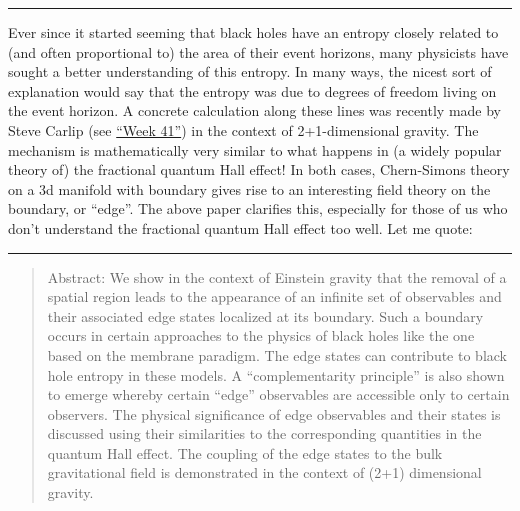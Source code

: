 \documentclass{article}
\def\tightlist{}
\renewcommand{\texttt}[1]{%
  \begingroup
  \ttfamily
  \begingroup\lccode`~=`/\lowercase{\endgroup\def~}{/\discretionary{}{}{}}%
  \begingroup\lccode`~=`[\lowercase{\endgroup\def~}{[\discretionary{}{}{}}%
  \begingroup\lccode`~=`.\lowercase{\endgroup\def~}{.\discretionary{}{}{}}%
  \catcode`/=\active\catcode`[=\active\catcode`.=\active
  \scantokens{#1\noexpand}%
  \endgroup
}
\begin{document}
\begin{center}\rule{0.5\linewidth}{0.5pt}\end{center}


Ever since it started seeming that black holes have an entropy closely
related to (and often proportional to) the area of their event horizons,
many physicists have sought a better understanding of this entropy. In
many ways, the nicest sort of explanation would say that the entropy was
due to degrees of freedom living on the event horizon. A concrete
calculation along these lines was recently made by Steve Carlip (see
\protect\hyperlink{week41}{``Week 41''}) in the context of
2+1-dimensional gravity. The mechanism is mathematically very similar to
what happens in (a widely popular theory of) the fractional quantum Hall
effect! In both cases, Chern-Simons theory on a 3d manifold with
boundary gives rise to an interesting field theory on the boundary, or
``edge''. The above paper clarifies this, especially for those of us who
don't understand the fractional quantum Hall effect too well. Let me
quote:

\begin{center}\rule{0.5\linewidth}{0.5pt}\end{center}

\begin{quote}
Abstract: We show in the context of Einstein gravity that the removal of
a spatial region leads to the appearance of an infinite set of
observables and their associated edge states localized at its boundary.
Such a boundary occurs in certain approaches to the physics of black
holes like the one based on the membrane paradigm. The edge states can
contribute to black hole entropy in these models. A ``complementarity
principle'' is also shown to emerge whereby certain ``edge'' observables
are accessible only to certain observers. The physical significance of
edge observables and their states is discussed using their similarities
to the corresponding quantities in the quantum Hall effect. The coupling
of the edge states to the bulk gravitational field is demonstrated in
the context of (2+1) dimensional gravity.
\end{quote}
\end{document}
